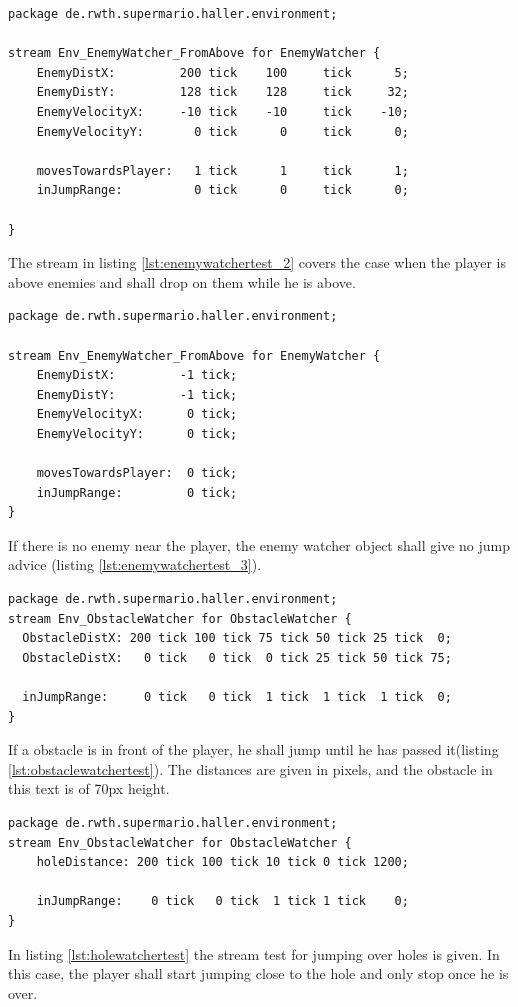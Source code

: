\begin{lstlisting}[label=lst:enemywatchertest_2, caption=Enemy watcher stream test]
package de.rwth.supermario.haller.environment;

stream Env_EnemyWatcher_FromAbove for EnemyWatcher {    
    EnemyDistX:         200 tick    100     tick      5;
    EnemyDistY:         128 tick    128     tick     32;
    EnemyVelocityX:     -10 tick    -10     tick    -10;
    EnemyVelocityY:       0 tick      0     tick      0;
            
    movesTowardsPlayer:   1 tick      1     tick      1;
    inJumpRange:          0 tick      0     tick      0;

}
\end{lstlisting}
The stream in listing \ref{lst:enemywatchertest_2} covers the case when the player is above enemies and shall drop on them while he is above.



\begin{lstlisting}[label=lst:enemywatchertest_3, caption=Enemy watcher stream test]
package de.rwth.supermario.haller.environment;

stream Env_EnemyWatcher_FromAbove for EnemyWatcher {   
    EnemyDistX:         -1 tick;
    EnemyDistY:         -1 tick;
    EnemyVelocityX:      0 tick;
    EnemyVelocityY:      0 tick;
            
    movesTowardsPlayer:  0 tick;
    inJumpRange:         0 tick;
}
\end{lstlisting}
If there is no enemy near the player, the enemy watcher object shall give no jump advice (listing \ref{lst:enemywatchertest_3}).



\begin{lstlisting}[label=lst:obstaclewatchertest, caption=Obstacle watcher stream test]
package de.rwth.supermario.haller.environment;
stream Env_ObstacleWatcher for ObstacleWatcher {
  ObstacleDistX: 200 tick 100 tick 75 tick 50 tick 25 tick  0;
  ObstacleDistX:   0 tick   0 tick  0 tick 25 tick 50 tick 75;
    
  inJumpRange:     0 tick   0 tick  1 tick  1 tick  1 tick  0;
}
\end{lstlisting}
If a obstacle is in front of the player, he shall jump until he has passed it(listing \ref{lst:obstaclewatchertest}). The distances are given in pixels, and the obstacle in this text is of 70px height.

\begin{lstlisting}[label=lst:holewatchertest, caption=Hole watcher stream test]
package de.rwth.supermario.haller.environment;
stream Env_ObstacleWatcher for ObstacleWatcher {
    holeDistance: 200 tick 100 tick 10 tick 0 tick 1200;
    
    inJumpRange:    0 tick   0 tick  1 tick	1 tick    0;
}
\end{lstlisting}

In listing \ref{lst:holewatchertest} the stream test for jumping over holes is given. In this case, the player shall start jumping close to the hole and only stop once he is over.


